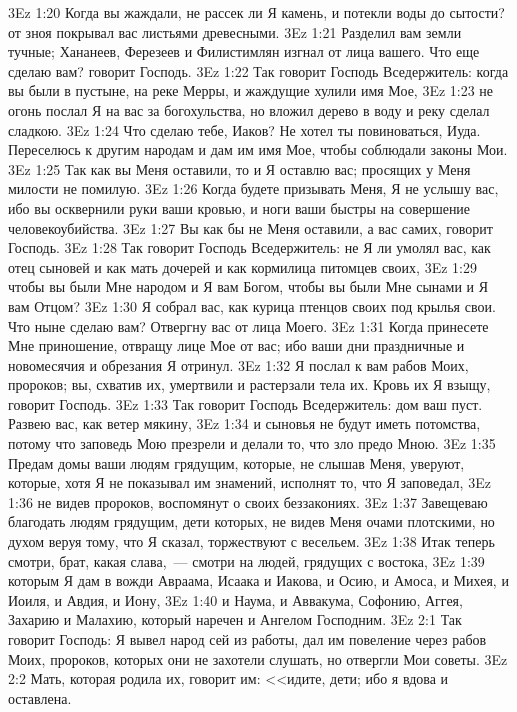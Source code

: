 \vs 3Ez 1:20 Когда вы жаждали, не рассек ли Я камень, и потекли воды до сытости? от зноя покрывал вас листьями древесными.
\vs 3Ez 1:21 Разделил вам земли тучные; Хананеев, Ферезеев и Филистимлян изгнал от лица вашего. Что еще сделаю вам? говорит Господь.
\vs 3Ez 1:22 Так говорит Господь Вседержитель: когда вы были в пустыне, на реке Мерры, и жаждущие хулили имя Мое,
\vs 3Ez 1:23 не огонь послал Я на вас за богохульства, но вложил дерево в воду и реку сделал сладкою.
\vs 3Ez 1:24 Что сделаю тебе, Иаков? Не хотел ты повиноваться, Иуда. Переселюсь к другим народам и дам им имя Мое, чтобы соблюдали законы Мои.
\vs 3Ez 1:25 Так как вы Меня оставили, то и Я оставлю вас; просящих у Меня милости не помилую.
\vs 3Ez 1:26 Когда будете призывать Меня, Я не услышу вас, ибо вы осквернили руки ваши кровью, и ноги ваши быстры на совершение человекоубийства.
\vs 3Ez 1:27 Вы как бы не Меня оставили, а вас самих, говорит Господь.
\vs 3Ez 1:28 Так говорит Господь Вседержитель: не Я ли умолял вас, как отец сыновей и как мать дочерей и как кормилица питомцев своих,
\vs 3Ez 1:29 чтобы вы были Мне народом и Я вам Богом, чтобы вы были Мне сынами и Я вам Отцом?
\vs 3Ez 1:30 Я собрал вас, как курица птенцов своих под крылья свои. Что ныне сделаю вам? Отвергну вас от лица Моего.
\vs 3Ez 1:31 Когда принесете Мне приношение, отвращу лице Мое от вас; ибо ваши дни праздничные и новомесячия и обрезания Я отринул.
\vs 3Ez 1:32 Я послал к вам рабов Моих, пророков; вы, схватив их, умертвили и растерзали тела их. Кровь их Я взыщу, говорит Господь.
\rsbpar\vs 3Ez 1:33 Так говорит Господь Вседержитель: дом ваш пуст. Развею вас, как ветер мякину,
\vs 3Ez 1:34 и сыновья не будут иметь потомства, потому что заповедь Мою презрели и делали то, что зло предо Мною.
\vs 3Ez 1:35 Предам домы ваши людям грядущим, которые, не слышав Меня, уверуют, которые, хотя Я не показывал им знамений, исполнят то, что Я заповедал,
\vs 3Ez 1:36 не видев пророков, воспомянут о своих беззакониях.
\vs 3Ez 1:37 Завещеваю благодать людям грядущим, дети которых, не видев Меня очами плотскими, но духом веруя тому, что Я сказал, торжествуют с весельем.
\vs 3Ez 1:38 Итак теперь смотри, брат, какая слава,~--- смотри на людей, грядущих с востока,
\vs 3Ez 1:39 которым Я дам в вожди Авраама, Исаака и Иакова, и Осию, и Амоса, и Михея, и Иоиля, и Авдия, и Иону,
\vs 3Ez 1:40 и Наума, и Аввакума, Софонию, Аггея, Захарию и Малахию, который наречен и Ангелом Господним.
\vs 3Ez 2:1 Так говорит Господь: Я вывел народ сей из работы, дал им повеление через рабов Моих, пророков, которых они не захотели слушать, но отвергли Мои советы.
\vs 3Ez 2:2 Мать, которая родила их, говорит им: <<идите, дети; ибо я вдова и оставлена.
